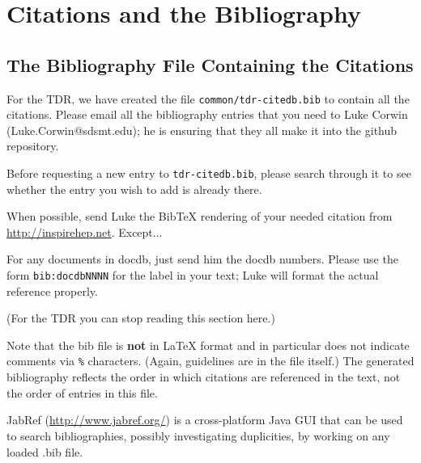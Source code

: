 \section{Citations and the Bibliography}
\label{sec:latex-cit}

\subsection{The Bibliography File Containing the Citations}
\label{sec:latex-bib-file}


For the TDR, we have created the file \texttt{common/tdr-citedb.bib} to contain all the citations.
Please email all the bibliography entries that you need to Luke Corwin (Luke.Corwin@sdsmt.edu); he is ensuring that they all make it into the github repository.

Before requesting a new entry to \texttt{tdr-citedb.bib}, please search through it
to see whether the entry you wish to add is already there.

When possible, send Luke the BibTeX rendering of your needed citation from \url{http://inspirehep.net}.  Except...

For any documents in docdb, just send him the docdb numbers. Please use the form %
\verb|bib:docdbNNNN| for the label in your text; Luke will format the actual reference properly.  %

(For the TDR you can stop reading this section here.)

Note that the bib file is \textbf{not} in \LaTeX{} format and in particular does not
indicate comments via \texttt{\%} characters. (Again, guidelines are in the file itself.)
The generated bibliography reflects the order in which citations are referenced in the text, not the order of entries in this file.


JabRef (\url{http://www.jabref.org/}) is a cross-platform Java GUI that can be used to search bibliographies, possibly investigating duplicities, by working on any loaded .bib file.

